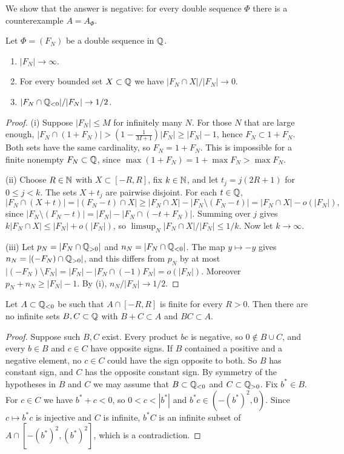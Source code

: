 We show that the answer is negative: for every double \Fol{} sequence $\Phi$ there is a
counterexample $A=A_\Phi$.

\begin{lemma}\label{SP:lem:folner}
Let $\Phi=(F_N)$ be a double \Fol{} sequence in $\mathbb{Q}$.
\begin{enumerate}[label=\textup{(\roman*)}]
\item $|F_N|\to\infty$.
\item For every bounded set $X\subset\mathbb{Q}$ we have $|F_N\cap X|/|F_N|\to0$.
\item $|F_N\cap\mathbb{Q}_{<0}|/|F_N|\to1/2$.
\end{enumerate}
\end{lemma}

\begin{proof}
(i) Suppose $|F_N|\le M$ for infinitely many $N$. For those $N$ that are large enough,
$|F_N\cap(1+F_N)|>(1-\frac1{M+1})|F_N|\ge|F_N|-1$, hence $F_N\subset1+F_N$. Both sets have the same
cardinality, so $F_N=1+F_N$. This is impossible for a finite nonempty $F_N\subset\mathbb{Q}$, since
$\max(1+F_N)=1+\max F_N>\max F_N$.

(ii) Choose $R\in\mathbb{N}$ with $X\subset[-R,R]$, fix $k\in\mathbb{N}$, and let $t_j=j(2R+1)$ for
$0\le j<k$. The sets $X+t_j$ are pairwise disjoint. For each $t\in\mathbb{Q}$,
\[
|F_N\cap(X+t)|=|(F_N-t)\cap X|\ge|F_N\cap X|-|F_N\setminus(F_N-t)|=|F_N\cap X|-o(|F_N|),
\]
since $|F_N\setminus(F_N-t)|=|F_N|-|F_N\cap(-t+F_N)|$. Summing over $j$ gives
$k|F_N\cap X|\le|F_N|+o(|F_N|)$, so $\limsup_N|F_N\cap X|/|F_N|\le1/k$. Now let $k\to\infty$.

(iii) Let $p_N=|F_N\cap\mathbb{Q}_{>0}|$ and $n_N=|F_N\cap\mathbb{Q}_{<0}|$. The map $y\mapsto-y$ gives
$n_N=|(-F_N)\cap\mathbb{Q}_{>0}|$, and this differs from $p_N$ by at most
$|(-F_N)\setminus F_N|=|F_N|-|F_N\cap(-1)F_N|=o(|F_N|)$. Moreover $p_N+n_N\ge|F_N|-1$. By (i),
$n_N/|F_N|\to1/2$.
\end{proof}

\begin{lemma}\label{SP:lem:noconf}
Let $A\subset\mathbb{Q}_{<0}$ be such that $A\cap[-R,R]$ is finite for every $R>0$. Then there are no
infinite sets $B,C\subset\mathbb{Q}$ with $B+C\subset A$ and $BC\subset A$.
\end{lemma}

\begin{proof}
Suppose such $B,C$ exist. Every product $bc$ is negative, so $0\notin B\cup C$, and every
$b\in B$ and $c\in C$ have opposite signs. If $B$ contained a positive and a negative element,
no $c\in C$ could have the sign opposite to both. So $B$ has constant sign, and $C$ has the
opposite constant sign. By symmetry of the hypotheses in $B$ and $C$ we may assume that
$B\subset\mathbb{Q}_{<0}$ and $C\subset\mathbb{Q}_{>0}$. Fix $b^*\in B$. For $c\in C$ we have $b^*+c<0$, so
$0<c<|b^*|$ and $b^*c\in(-(b^*)^2,0)$. Since $c\mapsto b^*c$ is injective and $C$ is infinite,
$b^*C$ is an infinite subset of $A\cap[-(b^*)^2,(b^*)^2]$, which is a contradiction.
\end{proof}

